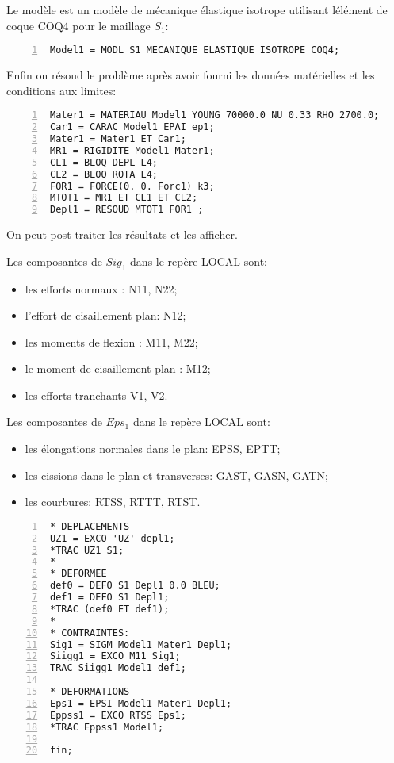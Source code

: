\medskip
Le modèle est un modèle de mécanique élastique isotrope utilisant lélément de coque COQ4 pour le maillage $S_1$:

\begin{Verbatim}[numbers=left,numbersep=3pt,firstnumber=last]
Model1 = MODL S1 MECANIQUE ELASTIQUE ISOTROPE COQ4;
\end{Verbatim}

\medskip
Enfin on résoud le problème après avoir fourni les données matérielles et les conditions aux limites:

\begin{Verbatim}[numbers=left,numbersep=3pt,firstnumber=last]
Mater1 = MATERIAU Model1 YOUNG 70000.0 NU 0.33 RHO 2700.0;
Car1 = CARAC Model1 EPAI ep1;
Mater1 = Mater1 ET Car1;
MR1 = RIGIDITE Model1 Mater1;
CL1 = BLOQ DEPL L4;
CL2 = BLOQ ROTA L4;
FOR1 = FORCE(0. 0. Forc1) k3;
MTOT1 = MR1 ET CL1 ET CL2;
Depl1 = RESOUD MTOT1 FOR1 ;
\end{Verbatim}

\medskip
On peut post-traiter les résultats et les afficher.

Les composantes de $Sig_1$ dans le repère LOCAL sont:
\begin{itemize}
   \item les efforts normaux : N11, N22;
   \item l'effort de cisaillement plan: N12; 
   \item les moments de flexion : M11, M22;
   \item le moment de cisaillement plan : M12;
   \item les efforts tranchants V1, V2.
\end{itemize}

Les composantes de $Eps_1$ dans le repère LOCAL sont:
\begin{itemize}
   \item les élongations normales dans le plan: EPSS, EPTT;
   \item les cissions dans le plan et transverses: GAST, GASN, GATN;
   \item les courbures: RTSS, RTTT, RTST.
\end{itemize}

\begin{Verbatim}[numbers=left,numbersep=3pt,firstnumber=last]
* DEPLACEMENTS
UZ1 = EXCO 'UZ' depl1;
*TRAC UZ1 S1;
*
* DEFORMEE
def0 = DEFO S1 Depl1 0.0 BLEU;
def1 = DEFO S1 Depl1;
*TRAC (def0 ET def1);
*
* CONTRAINTES: 
Sig1 = SIGM Model1 Mater1 Depl1;
Siigg1 = EXCO M11 Sig1;
TRAC Siigg1 Model1 def1;

* DEFORMATIONS
Eps1 = EPSI Model1 Mater1 Depl1;
Eppss1 = EXCO RTSS Eps1;
*TRAC Eppss1 Model1;

fin;
\end{Verbatim}


